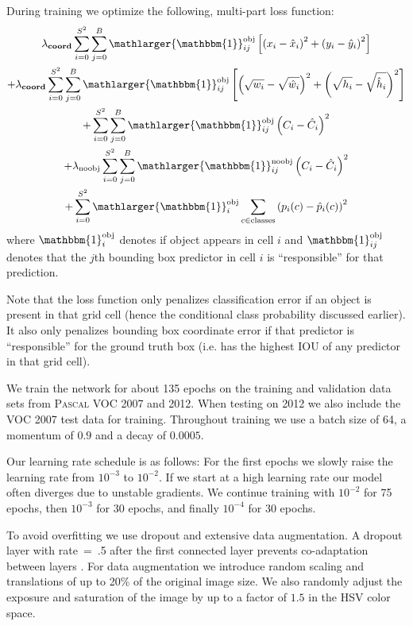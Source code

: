 During training we optimize the following, multi-part loss function:
\scriptsize
\begin{multline}
\lambda_\textbf{coord}
\sum_{i = 0}^{S^2}
 \sum_{j = 0}^{B}
 \mathlarger{\mathbbm{1}}_{ij}^{\text{obj}}
 \left[
 \left(
 x_i - \hat{x}_i
 \right)^2 +
 \left(
 y_i - \hat{y}_i
 \right)^2
 \right]
\\
+ \lambda_\textbf{coord} 
\sum_{i = 0}^{S^2}
 \sum_{j = 0}^{B}
 \mathlarger{\mathbbm{1}}_{ij}^{\text{obj}}
 \left[
 \left(
 \sqrt{w_i} - \sqrt{\hat{w}_i}
 \right)^2 +
 \left(
 \sqrt{h_i} - \sqrt{\hat{h}_i}
 \right)^2
 \right]
\\
+ \sum_{i = 0}^{S^2}
 \sum_{j = 0}^{B}
 \mathlarger{\mathbbm{1}}_{ij}^{\text{obj}}
 \left(
 C_i - \hat{C}_i
 \right)^2
\\
+ \lambda_\textrm{noobj}
\sum_{i = 0}^{S^2}
 \sum_{j = 0}^{B}
 \mathlarger{\mathbbm{1}}_{ij}^{\text{noobj}}
 \left(
 C_i - \hat{C}_i
 \right)^2
\\
+ \sum_{i = 0}^{S^2}
\mathlarger{\mathbbm{1}}_i^{\text{obj}}
 \sum_{c \in \textrm{classes}}
 \left(
 p_i(c) - \hat{p}_i(c)
 \right)^2
\end{multline}
\normalsize
where $\mathbbm{1}_i^{\text{obj}}$ denotes if object appears in cell $i$ and $\mathbbm{1}_{ij}^{\text{obj}}$ denotes that the $j$th bounding box predictor in cell $i$ is ``responsible'' for that prediction.

Note that the loss function only penalizes classification error if an object is present in that grid cell (hence the conditional class probability discussed earlier). It also only penalizes bounding box coordinate error if that predictor is ``responsible'' for the ground truth box (i.e. has the highest IOU of any predictor in that grid cell).

We train the network for about 135 epochs on the training and validation data sets from \textsc{Pascal} VOC 2007 and 2012. When testing on 2012 we also include the VOC 2007 test data for training. Throughout training we use a batch size of 64, a momentum of $0.9$ and a decay of $0.0005$.

Our learning rate schedule is as follows: For the first epochs we slowly raise the learning rate from $10^{-3}$ to $10^{-2}$. If we start at a high learning rate our model often diverges due to unstable gradients. We continue training with $10^{-2}$ for 75 epochs, then $10^{-3}$ for 30 epochs, and finally $10^{-4}$ for 30 epochs.

To avoid overfitting we use dropout and extensive data augmentation. A dropout layer with rate~=~.5 after the first connected layer prevents co-adaptation between layers \cite{hinton2012improving}. For data augmentation we introduce random scaling and translations of up to 20\% of the original image size. We also randomly adjust the exposure and saturation of the image by up to a factor of $1.5$ in the HSV color space.

